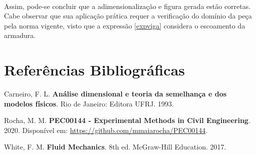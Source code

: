     \begin{center}
    \end{center}
    { \hspace*{\fill} \\}
    
    Assim, pode-se concluir que a adimensionalização e figura gerada estão
corretas. Cabe observar que sua aplicação prática requer a verificação
do domínio da peça pela norma vigente, visto que a expressão
\ref{expviga} considera o escoamento da armadura.

    \hypertarget{referuxeancias-bibliogruxe1ficas}{%
\section{Referências Bibliográficas}\label{referuxeancias-bibliogruxe1ficas}}

Carneiro, F. L. {\bf Análise dimensional e teoria da semelhança e dos modelos
físicos}. Rio de Janeiro: Editora UFRJ. 1993.

Rocha, M. M. {\bf PEC00144 - Experimental Methods in Civil Engineering}. 2020.
Disponível em: \url{https://github.com/mmaiarocha/PEC00144}.

White, F. M. {\bf Fluid Mechanics}. 8th ed. McGraw-Hill Education. 2017.


    
    
    

